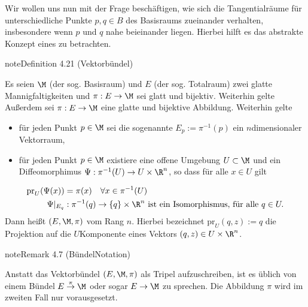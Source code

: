 \documentclass[letterpaper,10pt,german]{jupyterBook}
\begin{document}
\sphinxAtStartPar
Wir wollen uns nun mit der Frage beschäftigen, wie sich die Tangentialräume für unterschiedliche Punkte \(p,q\in B\) des Basisraums zueinander verhalten, insbesondere wenn \(p\) und \(q\) nahe beieinander liegen.
Hierbei hilft es das abstrakte Konzept eines  zu betrachten.
\label{manifolds/tangential:definition-24}
\begin{sphinxadmonition}{note}{Definition 4.21 (Vektorbündel)}



\sphinxAtStartPar
Es seien \(\M\) (der sog. Basisraum) und \(E\) (der sog. Totalraum) zwei glatte Mannigfaltigkeiten und \(\pi:E\to \M\) sei glatt und bijektiv. Weiterhin gelte
Außerdem sei \(\pi:E\to \M\) eine glatte und bijektive Abbildung.
Weiterhin gelte
\begin{itemize}
\item {} 
\sphinxAtStartPar
für jeden Punkt \(p\in \M\) sei die sogenannte  \(E_p:= \pi^{-1}(p)\) ein \(n\)\sphinxhyphen{}dimensionaler Vektorraum,

\item {} 
\sphinxAtStartPar
für jeden Punkt \(p\in \M\) existiere eine offene Umgebung \(U\subset \M\) und ein Diffeomorphimus \(\Psi: \pi^{-1}(U)\to U\times\R^n\), so dass für alle \(x\in U\) gilt

\end{itemize}
\begin{equation*}
\begin{split}\text{pr}_U(\Psi(x)) &= \pi(x)\quad\forall x\in \pi^{-1}(U)\\
\Psi\rvert_{E_q}&: \pi^{-1}(q) \to \{q\}\times \R^n \text{ ist ein Isomorphismus, für alle }q\in U.\end{split}
\end{equation*}
\sphinxAtStartPar
Dann heißt \((E,\M,\pi)\)  vom Rang \(n\).
Hierbei bezeichnet \(\text{pr}_U(q, z):= q\) die Projektion auf die \(U\)\sphinxhyphen{}Komponente eines Vektors \((q,z)\in U\times\R^n\).
\end{sphinxadmonition}
\label{manifolds/tangential:remark-25}
\begin{sphinxadmonition}{note}{Remark 4.7 (Bündel\sphinxhyphen{}Notation)}



\sphinxAtStartPar
Anstatt das Vektorbündel \((E,\M,\pi)\) als Tripel aufzuschreiben, ist es üblich von einem Bündel \(E\overset{\pi}{\to}\M\) oder sogar \(E\to\M\) zu sprechen.
Die Abbildung \(\pi\) wird im zweiten Fall nur  vorausgesetzt.
\end{sphinxadmonition}
\end{document}
